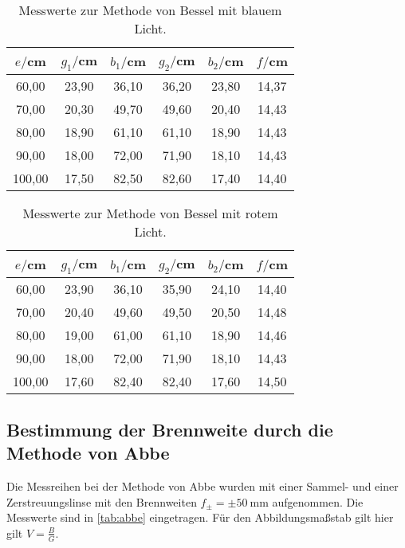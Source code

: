 \begin{table}[htp]
	\begin{center}
    \caption{Messwerte zur Methode von Bessel mit blauem Licht.}
    \label{tab:besselblau}
		\begin{tabular}{cccccc}
		\toprule
			{$e/$cm} & {$g_1/$cm} & {$b_1/$cm} & {$g_2/$cm} & {$b_2/$cm} & {$f/$cm}\\
			\midrule
			60,00 & 23,90 & 36,10 & 36,20 & 23,80 & 14,37\\
			70,00 & 20,30 & 49,70 & 49,60 & 20,40 & 14,43\\
			80,00 & 18,90 & 61,10 & 61,10 & 18,90 & 14,43\\
			90,00 & 18,00 & 72,00 & 71,90 & 18,10 & 14,43\\
		  100,00 & 17,50 & 82,50 & 82,60 & 17,40 & 14,40\\
		\bottomrule
		\end{tabular}
	\end{center}
\end{table}

\begin{table}[htp]
	\begin{center}
    \caption{Messwerte zur Methode von Bessel mit rotem Licht.}
    \label{tab:besselrot}
		\begin{tabular}{cccccc}
		\toprule
			{$e/$cm} & {$g_1/$cm} & {$b_1/$cm} & {$g_2/$cm} & {$b_2/$cm} & {$f/$cm}\\
			\midrule
			60,00 & 23,90 & 36,10 & 35,90 & 24,10 & 14,40\\
			70,00 & 20,40 & 49,60 & 49,50 & 20,50 & 14,48\\
			80,00 & 19,00 & 61,00 & 61,10 & 18,90 & 14,46\\
			90,00 & 18,00 & 72,00 & 71,90 & 18,10 & 14,43\\
			100,00 & 17,60 & 82,40 & 82,40 & 17,60 & 14,50\\
		\bottomrule
		\end{tabular}
	\end{center}
\end{table}


\subsection{Bestimmung der Brennweite durch die Methode von Abbe}
Die Messreihen bei der Methode von Abbe wurden mit einer Sammel- und einer
Zerstreuungslinse mit den Brennweiten $f_{\pm} = \pm \SI{50}{\mm}$ aufgenommen.
Die Messwerte sind in \ref{tab:abbe} eingetragen. Für den Abbildungsmaßstab gilt
hier gilt $V=\frac{B}{G}$.

